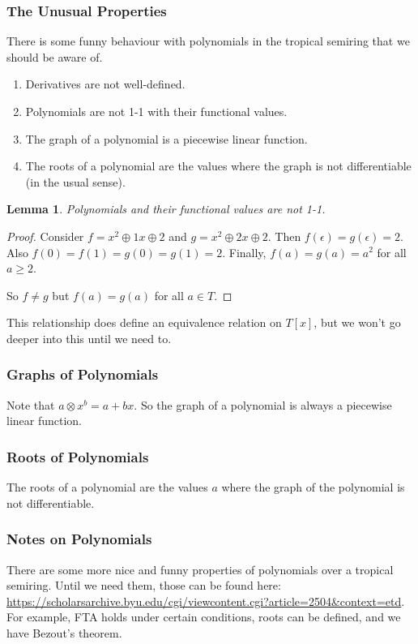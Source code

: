 \documentclass{article}
\newtheorem{lemma}{Lemma}
\begin{document}
\subsubsection{The Unusual Properties}
There is some funny behaviour with polynomials in the tropical semiring that we should be aware of.
\begin{enumerate}
	\item Derivatives are not well-defined.
	\item Polynomials are not 1-1 with their functional values.
	\item The graph of a polynomial is a piecewise linear function.
	\item The roots of a polynomial are the values where the graph is not differentiable (in the usual sense).
\end{enumerate}

\begin{lemma}
	Polynomials and their functional values are not 1-1.
\end{lemma}
\begin{proof}
	Consider $f = x^2 \oplus 1x \oplus 2$ and $g = x^2 \oplus 2x \oplus 2$.
	Then $f(\epsilon) = g(\epsilon) = 2$.
	Also $f(0) = f(1) = g(0) = g(1) = 2$.
	Finally, $f(a) = g(a) = a^2$ for all $a \geq 2$.

	So $f \neq g$ but $f(a) = g(a)$ for all $a \in T$.
\end{proof}

This relationship does define an equivalence relation on $T[x]$, but we won't go deeper into this until we need to.

\subsubsection{Graphs of Polynomials}
Note that $a \otimes x^b = a + bx$. So the graph of a polynomial is always a piecewise linear function.

\subsubsection{Roots of Polynomials}
The roots of a polynomial are the values $a$ where the graph of the polynomial is not differentiable.

\subsubsection{Notes on Polynomials}
There are some more nice and funny properties of polynomials over a tropical semiring.
Until we need them, those can be found here: \url{https://scholarsarchive.byu.edu/cgi/viewcontent.cgi?article=2504&context=etd}.
For example, FTA holds under certain conditions, roots can be defined, and we have Bezout's theorem.
\end{document}
